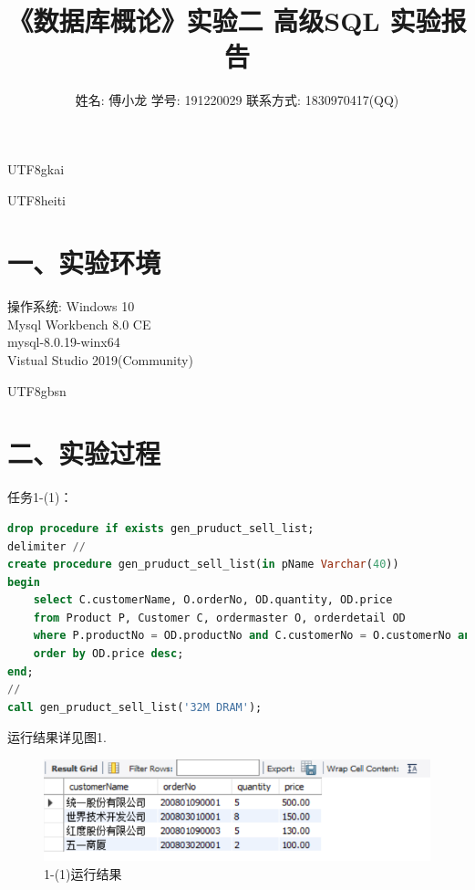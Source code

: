 \documentclass[a4paper,UTF8]{article}
\theoremstyle{definition}
\begin{document}
\begin{CJK}{UTF8}{gkai}

\title{\heiti《数据库概论》实验二 高级SQL 实验报告}
\author{
	\songti 姓名: 傅小龙  学号: 191220029  联系方式: 1830970417(QQ)
}
\date{}
\maketitle

\setlength{\baselineskip}{18pt}
\begin{flushleft}
\begin{CJK*}{UTF8}{heiti}
\section*{一、实验环境}
\end{CJK*}
\end{flushleft}
操作系统: Windows 10\\
Mysql Workbench 8.0 CE\\
mysql-8.0.19-winx64\\
Vistual Studio 2019(Community)\\

\begin{flushleft}
\begin{CJK*}{UTF8}{gbsn}
\section*{二、实验过程}
\end{CJK*}
\end{flushleft}

{\heiti \large 任务1-(1)：}
\begin{lstlisting}[language=SQL]
drop procedure if exists gen_pruduct_sell_list;
delimiter //
create procedure gen_pruduct_sell_list(in pName Varchar(40))
begin
	select C.customerName, O.orderNo, OD.quantity, OD.price
    from Product P, Customer C, ordermaster O, orderdetail OD
    where P.productNo = OD.productNo and C.customerNo = O.customerNo and O.orderNo = OD.orderNo and P.productName = pName
    order by OD.price desc;
end;
//
call gen_pruduct_sell_list('32M DRAM');
\end{lstlisting}
\par 运行结果详见图1.
\begin{figure}[h]
\centering
\includegraphics[scale=0.6]{./img/1-1.png}
\caption{1-(1)运行结果}
\label{fig:label}
\end{figure}


\end{CJK}
\end{document}
